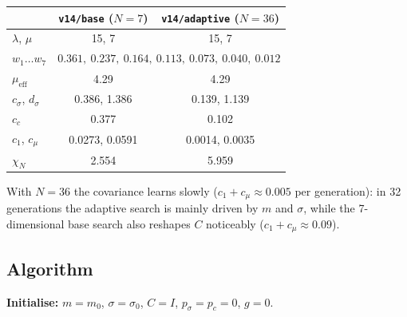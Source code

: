 \documentclass[11pt,a4paper]{article}
\begin{document}
\begin{center}
\small
\begin{tabular}{lcc}
  \toprule
  & \texttt{v14/base} ($N = 7$) & \texttt{v14/adaptive} ($N = 36$) \\
  \midrule
  $\lambda$, $\mu$ & 15, 7 & 15, 7 \\
  $w_1 \dots w_7$ & \multicolumn{2}{c}{$0.361,\ 0.237,\ 0.164,\ 0.113,\ 0.073,\ 0.040,\ 0.012$} \\
  $\mu_{\mathrm{eff}}$ & 4.29 & 4.29 \\
  $c_\sigma$, $d_\sigma$ & 0.386, 1.386 & 0.139, 1.139 \\
  $c_c$ & 0.377 & 0.102 \\
  $c_1$, $c_\mu$ & 0.0273, 0.0591 & 0.0014, 0.0035 \\
  $\chi_N$ & 2.554 & 5.959 \\
  \bottomrule
\end{tabular}
\end{center}
With $N = 36$ the covariance learns slowly ($c_1 + c_\mu \approx 0.005$ per generation): in 32 generations the
adaptive search is mainly driven by $m$ and $\sigma$, while the 7-dimensional base search also reshapes $C$
noticeably ($c_1 + c_\mu \approx 0.09$).

\subsection{Algorithm}
\textbf{Initialise:} $m = m_0$, $\sigma = \sigma_0$, $C = I$, $p_\sigma = p_c = 0$, $g = 0$.
\end{document}
